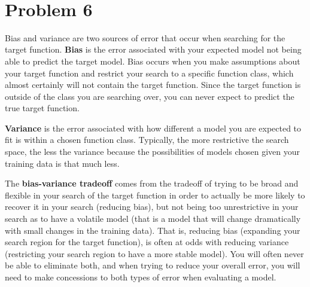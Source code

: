 \documentclass[11pt]{article}
\begin{document}
\begin{center}

\ \\
\end{center}


\section*{Problem 6}

\vspace{5 mm}
\noindent
Bias and variance are two sources of error that occur when searching for the 
target function. {\bf Bias} is the error associated with your expected model 
not being able to predict the target model. Bias occurs when you make 
assumptions about your target function and restrict your search to a specific 
function class, which almost certainly will not contain the target function. 
Since the target function is outside of the class you are searching over, you 
can never expect to predict the true target function.

\vspace{5 mm}
\noindent
{\bf Variance} is the error associated with how different a model you are 
expected to fit is within a chosen function class. Typically, the more 
restrictive the search space, the less the variance because the possibilities of 
models chosen given your training data is that much less.

\vspace{5 mm}
\noindent
The {\bf bias-variance tradeoff} comes from the tradeoff of trying to be broad 
and flexible in your search of the target function in order to actually be more 
likely to recover it in your search (reducing bias), but not being too 
unrestrictive in your search as to have a volatile model (that is a model that 
will change dramatically with small changes in the training data). That is, 
reducing bias (expanding your search region for the target function), is often 
at odds with reducing variance (restricting your search region to have a more 
stable model). You will often never be able to eliminate both, and when trying 
to reduce your overall error, you will need to make concessions to both types 
of error when evaluating a model.
\end{document}
